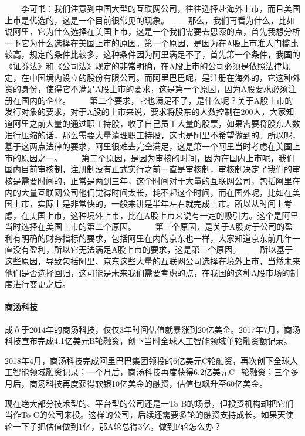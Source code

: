 \documentclass[letterpaper,11pt,english]{sphinxmanual}
\begin{document}
　　李可书：我们注意到中国大型的互联网公司，往往选择赴海外上市，而且美国上市是优选的，这是一个目前很常见的现象。
　　那么，我们再看为什么，比如说阿里，它为什么选择在美国上市，这是一个我们需要去思索的点，首先我想分析一下它为什么选择在美国上市的原因。第一个原因，是因为在A股上市准入门槛比较高，规定的条件比较多，这种条件因为阿里满足不了，首先第一个条件，我国的《证券法》和《公司法》规定的非常明确，在A股上市的公司必须是依照法律规定，在中国境内设立的股份有限公司。而阿里巴巴呢，是注册在海外的，它这种外资的身份，使得它不满足A股上市的要求，这是第一个原因，因为A股要求必须注册在国内的企业。
　　第二个要求，它也满足不了，是什么呢？关于A股上市的发行对象的要求，对于A股的上市来说，要求将股东的人数控制在200人，大家知道阿里之前大量的通过职工持股，收了自己员工大量的股票，如果需要将股东人数进行压缩的话，那么需要大量清理职工持股，这也是阿里不希望做到的。所以呢，基于这两点法律的要求，阿里很难去完全满足，这是第一个阿里当时考虑在美国上市的原因之一。
　　第二个原因，是因为审核的时间，因为在国内上市呢，我们国内目前审核制，注册制没有正式实行之前一直是审核制，审核制决定了我们的审核是需要时间的，正常是两到三年，这个时间对于大量的互联网公司，包括阿里在内的大量互联网公司他们觉得时间太长，耗不起这个时间，而在国外呢，比如在美国上市，实际上是非常快的，一般来讲是半年左右就完成上市。所以从时间上考虑，在美国上市，这种境外上市，比在A股上市来说有一定的吸引力。这个是阿里当时选择在美国上市的第二个原因。
　　第三个原因，是关于A股对于公司的盈利有明确的财务指标的要求，包括阿里在内的京东也一样，大家知道京东前几年一直没有盈利，所以它无法满足A股上市的要求，这是第三个原因。
　　所以基于这些原因，导致包括阿里、京东这些大量的互联网公司选择在境外上市，当然未来他们是否选择回归，这可能是未来我们需要考虑的点，在我国的这种A股市场的制度进行变更之后。


\paragraph{商汤科技}
\label{\detokenize{chapter_knowledge/Valuation:id4}}
成立于2014年的商汤科技，仅仅3年时间估值就暴涨到20亿美金。2017年7月，商汤科技宣布完成4.1亿美元B轮融资，创下当时全球人工智能领域单轮融资额记录。

2018年4月，商汤科技完成阿里巴巴集团领投的6亿美元C轮融资，再次创下全球人工智能领域融资记录；一个月后，商汤科技再度获得6.2亿美元C+轮融资；三个多月后，商汤科技再度获得软银10亿美金的融资，估值也飙升至60亿美金。

现在绝大部分技术型的、平台型的公司还是一To
B的场景，但投资机构却把它们当作To
C的公司来投。这样的公司，后续还需要多轮的融资支持成长。如果天使轮一下子把估值做到1亿，那A轮总得3亿，做到F轮怎么办？
\end{document}
